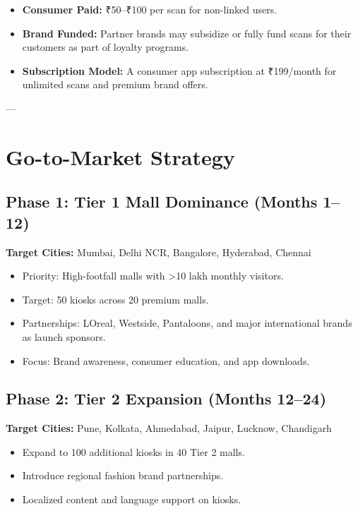 \documentclass[12pt,a4paper]{article}
\begin{document}
\begin{itemize}
    \item \textbf{Consumer Paid:} ₹50--₹100 per scan for non-linked users.
    \item \textbf{Brand Funded:} Partner brands may subsidize or fully fund scans for their customers as part of loyalty programs.
    \item \textbf{Subscription Model:} A consumer app subscription at ₹199/month for unlimited scans and premium brand offers.
\end{itemize}

---

\section{Go-to-Market Strategy}

\subsection{Phase 1: Tier 1 Mall Dominance (Months 1--12)}

\textbf{Target Cities:} Mumbai, Delhi NCR, Bangalore, Hyderabad, Chennai

\begin{itemize}
    \item Priority: High-footfall malls with >10 lakh monthly visitors.
    \item Target: 50 kiosks across 20 premium malls.
    \item Partnerships: LOreal, Westside, Pantaloons, and major international brands as launch sponsors.
    \item Focus: Brand awareness, consumer education, and app downloads.
\end{itemize}

\subsection{Phase 2: Tier 2 Expansion (Months 12--24)}

\textbf{Target Cities:} Pune, Kolkata, Ahmedabad, Jaipur, Lucknow, Chandigarh

\begin{itemize}
    \item Expand to 100 additional kiosks in 40 Tier 2 malls.
    \item Introduce regional fashion brand partnerships.
    \item Localized content and language support on kiosks.
\end{itemize}
\end{document}
